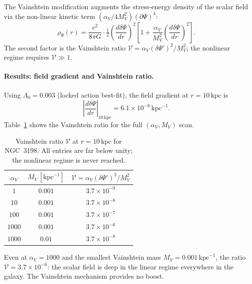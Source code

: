 \documentclass[12pt,a4paper]{article}
\begin{document}
The Vainshtein modification augments the stress-energy density of the scalar field via
the non-linear kinetic term $(\alpha_V/4M_V^2)(\partial\Psi)^4$:
\begin{equation}
\rho_\Psi(r) = \frac{c^2}{8\pi G}
  \cdot\tfrac{1}{2}\!\left(\frac{d\delta\Psi}{dr}\right)^{\!2}
  \left[1 + \frac{\alpha_V}{M_V^2}\!\left(\frac{d\delta\Psi}{dr}\right)^{\!2}\right].
\label{eq:rho_Vainshtein}
\end{equation}
The second factor is the Vainshtein ratio $\mathcal{V} = \alpha_V(\delta\Psi')^2/M_V^2$;
the nonlinear regime requires $\mathcal{V} \gg 1$.

\paragraph{Results: field gradient and Vainshtein ratio.}
Using $\Lambda_0 = 0.003$ (locked action best-fit), the field gradient at
$r = 10\,\mathrm{kpc}$ is
\begin{equation}
\left|\frac{d\delta\Psi}{dr}\right|_{10\,\mathrm{kpc}} = 6.1\times10^{-8}\,\mathrm{kpc}^{-1}.
\end{equation}
Table~\ref{tab:sim103_vainshtein} shows the Vainshtein ratio for the full
$(\alpha_V, M_V)$ scan.

\begin{table}[h]
\begin{center}
\caption{Vainshtein ratio $\mathcal{V}$ at $r=10\,\mathrm{kpc}$ for NGC~3198.
All entries are far below unity; the nonlinear regime is never reached.}
\label{tab:sim103_vainshtein}
\begin{tabular}{ccc}
\toprule
$\alpha_V$ & $M_V\,[\mathrm{kpc}^{-1}]$ & $\mathcal{V} = \alpha_V(\delta\Psi')^2/M_V^2$ \\
\midrule
$1$    & $0.001$ & $3.7\times10^{-9}$ \\
$10$   & $0.001$ & $3.7\times10^{-8}$ \\
$100$  & $0.001$ & $3.7\times10^{-7}$ \\
$1000$ & $0.001$ & $3.7\times10^{-6}$ \\
$1000$ & $0.01$  & $3.7\times10^{-8}$ \\
\bottomrule
\end{tabular}
\end{center}
\end{table}

Even at $\alpha_V = 1000$ and the smallest Vainshtein mass $M_V = 0.001\,\mathrm{kpc}^{-1}$,
the ratio $\mathcal{V} = 3.7\times10^{-6}$: the scalar field is deep in the linear
regime everywhere in the galaxy.  The Vainshtein mechanism provides no boost.
\end{document}
